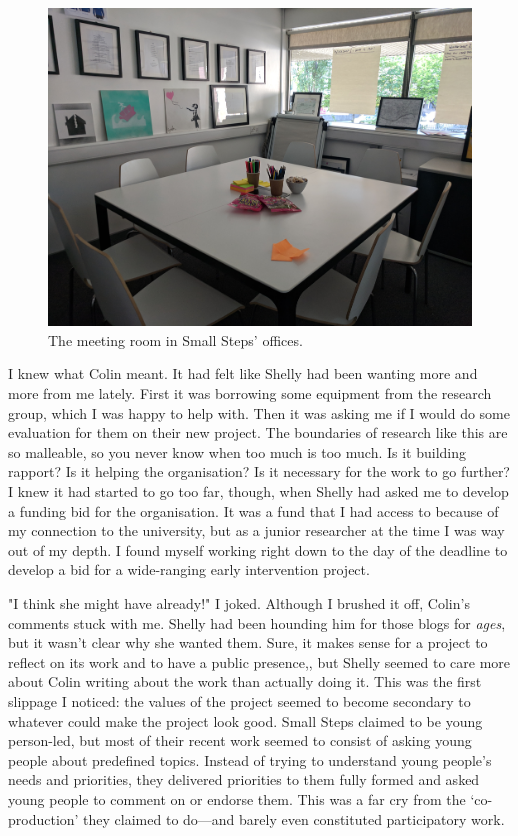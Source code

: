 \begin{figure}
    \centering
    \includegraphics[width=1\linewidth]{Images/3/small-steps.jpg}
    \caption{The meeting room in Small Steps' offices.}
    \label{fig:small-steps}
\end{figure}

I knew what Colin meant. It had felt like Shelly had been wanting more and more from me lately. First it was borrowing some equipment from the research group, which I was happy to help with. Then it was asking me if I would do some evaluation for them on their new project. The boundaries of research like this are so malleable, so you never know when too much is too much. Is it building rapport? Is it helping the organisation? Is it necessary for the work to go further? I knew it had started to go too far, though, when Shelly had asked me to develop a funding bid for the organisation. It was a fund that I had access to because of my connection to the university, but as a junior researcher at the time I was way out of my depth. I found myself working right down to the day of the deadline to develop a bid for a wide-ranging early intervention project. 

"I think she might have already!" I joked. Although I brushed it off, Colin's comments stuck with me. Shelly had been hounding him for those blogs for \textit{ages}, but it wasn't clear why she wanted them. Sure, it makes sense for a project to reflect on its work and to have a public presence,, but Shelly seemed to care more about Colin writing about the work than actually doing it. This was the first slippage I noticed: the values of the project seemed to become secondary to whatever could make the project look good. Small Steps claimed to be young person-led, but most of their recent work seemed to consist of asking young people about predefined topics. Instead of trying to understand young people's needs and priorities, they delivered priorities to them fully formed and asked young people to comment on or endorse them. This was a far cry from the `co-production' they claimed to do—and barely even constituted participatory work. 

